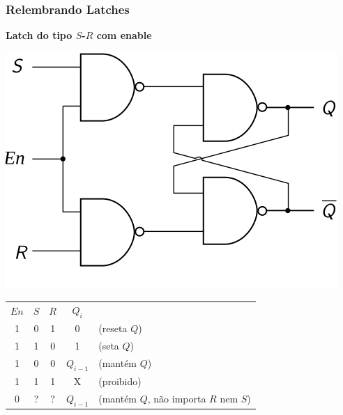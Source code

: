 \documentclass{beamer}
\begin{document}
\begin{frame}
\frametitle{Relembrando Latches}

\vspace{-6pt}

\textbf{Latch do tipo $S$-$R$ com enable}

\begin{center}
\includegraphics[scale=0.8]{images/latchRSnandEnable_circuit}%
%
\raisebox{60pt}{\Huge=}%
%
%

\begin{tabular}{ccc||cl}
$En$ & $S$ & $R$ & $Q_i$ \\
\cline{1-4}
 1   &  0  &  1  &   0  & (reseta $Q$) \\
 1   &  1  &  0  &   1  & (seta $Q$) \\
 1   &  0  &  0  & $Q_{i-1}$  & (mantém $Q$) \\
 1   &  1  &  1  & X  & (proibido) \\
 0   &  ?  &  ?  & $Q_{i-1}$  & (mantém $Q$, não importa $R$ nem $S$) \\
\end{tabular}
\end{center}
\end{frame}
\end{document}
